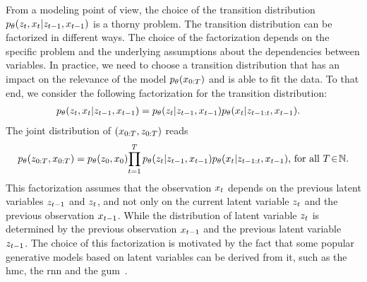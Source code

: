 From a modeling point of view, the choice of the transition distribution
$p_{\theta}(z_t,x_t|z_{t-1},x_{t-1})$ is a thorny problem.
The transition distribution can be factorized
in different ways. The choice of the factorization depends on the specific problem
and the underlying  assumptions  about the dependencies between variables.
In practice, we need to choose a transition distribution that has an impact on
the relevance of the model $p_{\theta}(x_{0:T})$ and is able to fit the data.
To that end, we consider the following factorization for the transition distribution:
\begin{align}
    \label{eq:pmc_gen_transition}
    p_{\theta}(z_t,x_t|& z_{t-1},x_{t-1}) =
    p_{\theta}(z_t|z_{t-1},x_{t-1})p_{\theta}(x_t|z_{t-1:t},x_{t-1}) \text{.}
\end{align}
The joint distribution of $(x_{0:T}, z_{0:T})$ reads
\begin{equation}
    \label{eq:pmc_gen_t}
    p_{\theta}(z_{0:T}, x_{0:T}) =
    p_{\theta}(z_0,x_0)\!\prod_{t=1}^T 
    p_{\theta}(z_t|z_{t-1},x_{t-1})p_{\theta}(x_t|z_{t-1:t},x_{t-1}) \text{, } \text{for all } T \!\in\! \mathbb{N}  \text{.}
\end{equation}
This factorization assumes that the observation $x_t$ depends 
on the previous latent variables
$z_{t-1}$ and $z_t$, 
and not only on the current latent variable $z_t$
and the previous observation $x_{t-1}$.
While the distribution of latent variable $z_t$ is determined 
by the previous observation $x_{t-1}$ 
and the previous latent variable $z_{t-1}$.
The choice of this factorization is motivated by the fact that some popular
generative models based on latent variables can be derived from it,
such as the \gls*{hmc}, the \gls*{rnn}  and the \gls*{gum}~\citep{salaun2019comparing}.



